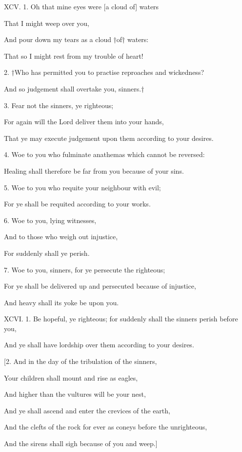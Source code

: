 XCV. 1. Oh that mine eyes were [a cloud of] waters

That I might weep over you,

And pour down my tears as a cloud †of† waters:

That so I might rest from my trouble of heart!

2. †Who has permitted you to practise reproaches and wickedness?

And so judgement shall overtake you, sinners.†

3. Fear not the sinners, ye righteous;

For again will the Lord deliver them into your hands,

That ye may execute judgement upon them according to your desires.

4. Woe to you who fulminate anathemas which cannot be reversed:

Healing shall therefore be far from you because of your sins.

5. Woe to you who requite your neighbour with evil;

For ye shall be requited according to your works.

6. Woe to you, lying witnesses,

And to those who weigh out injustice,

For suddenly shall ye perish.

7. Woe to you, sinners, for ye persecute the righteous;

For ye shall be delivered up and persecuted because of injustice,

And heavy shall its yoke be upon you.


XCVI. 1. Be hopeful, ye righteous; for suddenly shall the sinners perish before you,

And ye shall have lordship over them according to your desires.

[2. And in the day of the tribulation of the sinners,

Your children shall mount and rise as eagles,

And higher than the vultures will be your nest,

And ye shall ascend and enter the crevices of the earth,

And the clefts of the rock for ever as coneys before the unrighteous,

And the sirens shall sigh because of you and weep.]

